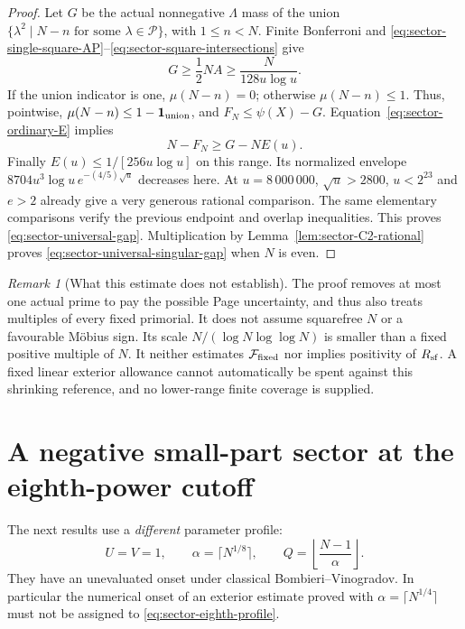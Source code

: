 \documentclass[11pt,a4paper]{article}
\theoremstyle{definition}
\theoremstyle{remark}
\newtheorem{remark}[theorem]{Remark}
\begin{document}
\begin{proof}
Let $G$ be the actual nonnegative $\Lambda$ mass of the union
$\{\lambda^2\mid N-n\text{ for some }\lambda\in\mathcal P\}$,
with $1\leq n<N$.  Finite Bonferroni and
\eqref{eq:sector-single-square-AP}--\eqref{eq:sector-square-intersections}
give
\begin{equation}
                 G\geq\frac12 NA\geq\frac{N}{128u\log u}.
 \label{eq:sector-lost-square-mass}
\end{equation}
If the union indicator is one, $\mu(N-n)=0$; otherwise
$\mu(N-n)\leq1$.  Thus, pointwise,
$\mu(N-n)\leq1-\mathbf1_{\rm union}$, and
$F_N\leq\psi(X)-G$.  Equation~\eqref{eq:sector-ordinary-E} implies
\[
                  N-F_N\geq G-NE(u).
\]
Finally $E(u)\leq1/[256u\log u]$ on this range.  Its normalized
envelope $8704u^3\log u\,e^{-(4/5)\sqrt u}$ decreases here.  At
$u=8\,000\,000$, $\sqrt u>2800$, $u<2^{23}$ and $e>2$ already
give a very generous rational comparison.  The same elementary
comparisons verify the previous endpoint and overlap inequalities.
This proves \eqref{eq:sector-universal-gap}.  Multiplication by
Lemma~\ref{lem:sector-C2-rational} proves
\eqref{eq:sector-universal-singular-gap} when $N$ is even.
\end{proof}

\begin{remark}[What this estimate does not establish]
The proof removes at most one actual prime to pay the possible Page
uncertainty, and thus also treats multiples of every fixed primorial.
It does not assume squarefree $N$ or a favourable M\"obius sign.
Its scale $N/(\log N\log\log N)$ is smaller than a fixed positive
multiple of $N$.  It neither estimates $\mathcal F_{\rm fixed}$
nor implies positivity of $R_{\rm sf}$.  A fixed linear exterior
allowance cannot automatically be spent against this shrinking
reference, and no lower-range finite coverage is supplied.
\end{remark}

\section{A negative small-part sector at the eighth-power cutoff}
\label{sec:sector-eighth-negative}

The next results use a \emph{different} parameter profile:
\begin{equation}
 U=V=1,\qquad\alpha=\lceil N^{1/8}\rceil,\qquad
 Q=\left\lfloor\frac{N-1}{\alpha}\right\rfloor.
 \label{eq:sector-eighth-profile}
\end{equation}
They have an unevaluated onset under classical
Bombieri--Vinogradov.  In particular the numerical onset of an
exterior estimate proved with $\alpha=\lceil N^{1/4}\rceil$ must
not be assigned to \eqref{eq:sector-eighth-profile}.
\end{document}
